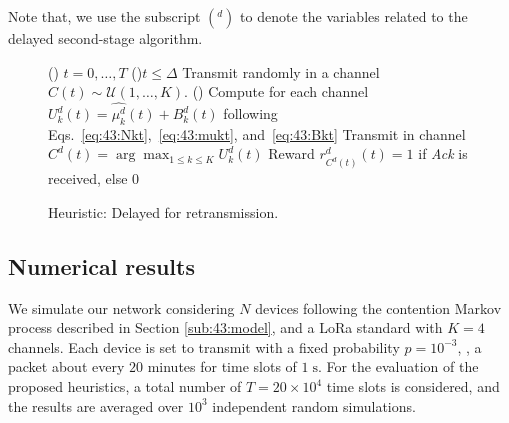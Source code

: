 Note that, we use the subscript $({}^d)$ to denote the variables
related to the delayed second-stage \UCB{} algorithm.

\vspace*{-3pt}
	\begin{figure}[h!]
		\centering
		\begin{algorithm}[H]
			\For()
			{$t = 0, \dots, T$}{
				\uElseIf(){$t \leq \Delta$}{
					Transmit randomly in a channel $C(t) \sim \mathcal{U}(1,\ldots,K)$.
				}
				\Else(){
					Compute for each channel $ U^d_k(t) = \widehat{\mu^d_k}(t) + B^d_k(t)$ following Eqs.~\eqref{eq:43:Nkt},~\eqref{eq:43:mukt}, and~\eqref{eq:43:Bkt}\;
					Transmit in channel $C^d(t) = \arg\max_{1\leq k \leq K} U^d_k(t)$\;
					Reward $r^d_{C^d(t)}(t) = 1$ if \emph{Ack} is received, else $0$\;
				}
			}
			\caption{Heuristic: Delayed \UCB{} for retransmission.}
			\label{algo:43:UCBwithDelay}
		\end{algorithm}
	\end{figure}


\subsection{Numerical results}
\label{sub:43:numExp}

We simulate our network considering $N$ devices following the contention Markov process described in Section \ref{sub:43:model}, and a LoRa standard with $K=4$ channels.
Each device is set to transmit with a fixed probability $p=10^{-3}$, \ie, a packet about every $20$ minutes for time slots of $1\;\mathrm{s}$.
%
For the evaluation of the proposed heuristics, a total number of $T=20 \times 10^4$ time slots is considered, and the results are averaged over $10^{3}$ independent random simulations.


